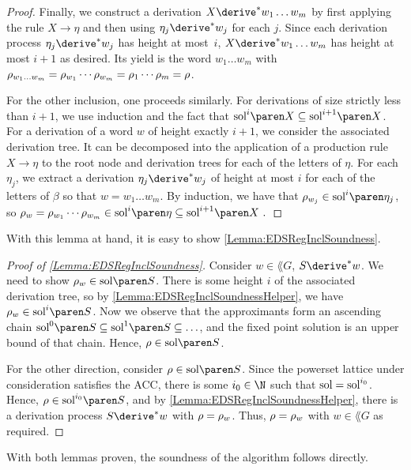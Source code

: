 \documentclass[../../diss.tex]{subfiles}
\begin{document}
\begin{proof}
    Finally, we construct a derivation $X \derive^* w_1 \ldots w_m$ by first applying the rule $X \to \eta$ and then using $\eta_j \derive^* w_j$ for each $j$.
    Since each derivation process $\eta_j \derive^* w_j$ has height at most~$i$, $X \derive^* w_1 \ldots w_m$ has height at most $i+1$ as desired.
    Its yield is the word $w_1 \ldots w_m$ with $\tbox{w_1 \ldots w_m} = \tbox{w_1} \cdots \tbox{w_m} = \tbox_1 \cdots \tbox_m = \tbox$.

    For the other inclusion, one proceeds similarly.
    For derivations of size strictly less than $i+1$, we use induction and the fact that $\sol{i}{X} \subseteq \sol{i+1}{X}$.
    For a derivation of a word $w$ of height exactly $i+1$, we consider the associated derivation tree.
    It can be decomposed into the application of a production rule $X \to \eta$ to the root node and derivation trees for each of the letters of $\eta$.
    For each $\eta_j$, we extract a derivation $\eta_j \derive^* w_j$ of height at most $i$ for each of the letters of $\beta$ so that $w = w_1 \ldots w_m$.
    By induction, we have that $\tbox{w_j} \in \sol{i}{\eta_j}$, so
    \(
        \tbox{w} = \tbox{w_1} \cdots \tbox{w_m} \in \sol{i}{\eta} \subseteq \sol{i+1}{X}
        \ .
    \)
\end{proof}

With this lemma at hand, it is easy to show \cref{Lemma:EDSRegInclSoundness}.

\begin{proof}[Proof of \cref{Lemma:EDSRegInclSoundness}]
    Consider $w \in \lang{G}$, \ie $S \derive^* w$.
    We need to show $\tbox{w} \in \sol{S}$.
    There is some height $i$ of the associated derivation tree, so by \cref{Lemma:EDSRegInclSoundnessHelper}, we have $\tbox{w} \in \sol{i}{S}$.
    Now we observe that the approximants form an ascending chain $\sol{0}{S} \subseteq \sol{1}{S} \subseteq \ldots$, and the fixed point solution is an upper bound of that chain.
    Hence, $\tbox \in \sol{S}$.

    For the other direction, consider $\tbox \in \sol{S}$.
    Since the powerset lattice under consideration satisfies the ACC, there is some $i_0 \in \N$ such that $\sol = \soli{i_0}$.
    Hence, $\tbox \in \sol{i_0}{S}$, and by \cref{Lemma:EDSRegInclSoundnessHelper}, there is a derivation process $S \derive^* w$ with $\tbox = \tbox{w}$.
    Thus, $\tbox = \tbox{w}$ with $w \in \lang{G}$ as required.
\end{proof}

With both lemmas proven, the soundness of the algorithm follows directly.
\end{document}
